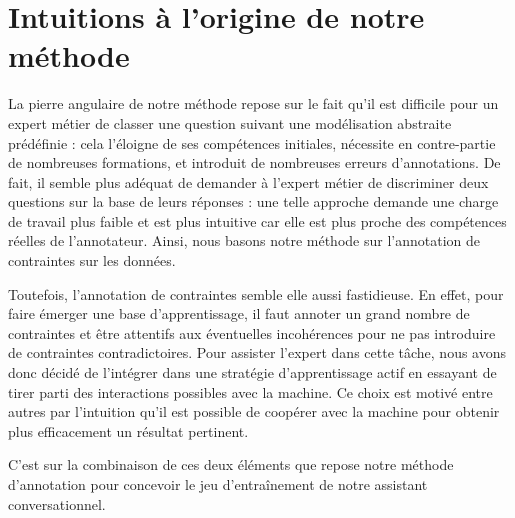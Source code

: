    \minitoc


    \section{Intuitions à l'origine de notre méthode}
    \label{section:3.1-DESCRIPTION-INTUITIONS}

		La pierre angulaire de notre méthode repose sur le fait qu'il est difficile pour un expert métier de classer une question suivant une modélisation abstraite prédéfinie :
		cela l'éloigne de ses compétences initiales, nécessite en contre-partie de nombreuses formations, et introduit de nombreuses erreurs d'annotations.
		De fait, il semble plus adéquat de demander à l'expert métier de discriminer deux questions sur la base de leurs réponses :
		une telle approche demande une charge de travail plus faible et est plus intuitive car elle est plus proche des compétences réelles de l'annotateur.
		Ainsi, nous basons notre méthode sur l'annotation de contraintes sur les données.
		
		Toutefois, l'annotation de contraintes semble elle aussi fastidieuse.
		En effet, pour faire émerger une base d'apprentissage, il faut annoter un grand nombre de contraintes et être attentifs aux éventuelles incohérences pour ne pas introduire de contraintes contradictoires.
		Pour assister l'expert dans cette tâche, nous avons donc décidé de l'intégrer dans une stratégie d'apprentissage actif en essayant de tirer parti des interactions possibles avec la machine. Ce choix est motivé entre autres par l'intuition qu'il est possible de coopérer avec la machine pour obtenir plus efficacement un résultat pertinent.

		C'est sur la combinaison de ces deux éléments que repose notre méthode d'annotation pour concevoir le jeu d’entraînement de notre assistant conversationnel.


